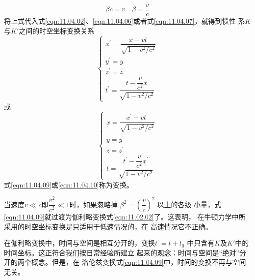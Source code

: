 \begin{equation}\label{eqn:11.04.08}
    \beta c = v \quad \beta = \frac v c
\end{equation}
将上式代入式\eqref{eqn:11.04.02}、\eqref{eqn:11.04.06}或者式\eqref{eqn:11.04.07}，就得到惯性
系$ K $与$ K' $之间的时空坐标变换关系
\begin{equation}\label{eqn:11.04.09}
    \begin{cases}
        x ^ { \prime } = \dfrac { x - v t } { \sqrt { 1 - v ^ 2 / c ^ 2 } } \\
        y ^ { \prime } = y \\
        z ^ { \prime } = z \\
        t ^ { \prime } = \dfrac { t - \dfrac v { c ^ 2 } x } { \sqrt { 1 - v ^ 2 / c ^ 2 } }
    \end{cases}
\end{equation}
或
\begin{equation}\label{eqn:11.04.10}
    \begin{cases}
        x = \dfrac { x ^ { \prime } - v t ^ { \prime } } { \sqrt { 1 - v ^ 2 / c ^ 2 } } \\
        y = y ^ { \prime } \\
        z = z ^ { \prime } \\
        t = \dfrac { t ^ { \prime } - \dfrac v { c ^ 2 } x ^ { \prime } } { \sqrt { 1 - v ^ 2 / c ^ 2 } }
    \end{cases}
\end{equation}
式\eqref{eqn:11.04.09}或\eqref{eqn:11.04.10}称为变换。

当速度$ v \ll c $即$ \dfrac { v ^ { 2 } } { c ^ { 2 } } \ll 1 $时，如果忽略掉
$ \beta ^ { 2 } = \left( \dfrac { v } { c } \right) ^ { 2 }  $
以上的各级
小量，式\eqref{eqn:11.04.09}就过渡为伽利略变换式\eqref{eqn:11.02.02}了。这表明，
在牛顿力学中所采用的时空坐标变换是只适用于低速情况的，在
高速情况它不正确。

在伽利略变换中，时间与空间是相互分开的，变换$ t ^ { \prime } = t + t _ { 0 }  $
中只含有$ K $及$ K ' $中的时间坐标。这正符合我们按日常经验所建立
起来的观念：时间与空间是“绝对”分开的两个概念。但是，在
洛伦兹变换\lhbrak 式\eqref{eqn:11.04.09}\rhbrak 中，时间的变换不再与空间无关。